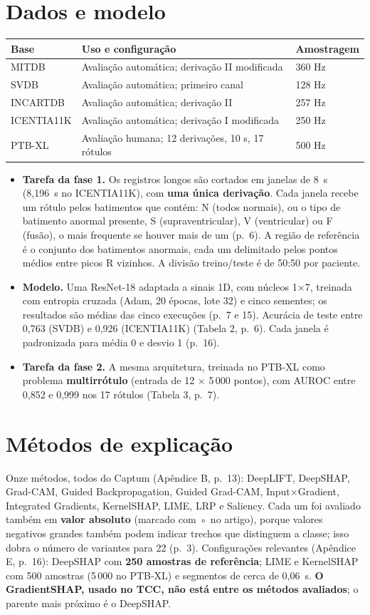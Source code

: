 \documentclass[11pt,a4paper]{article}
\begin{document}
\section{Dados e modelo}
\begin{center}\small
\begin{tabularx}{\linewidth}{lXl}
\toprule
\textbf{Base} & \textbf{Uso e configuração} & \textbf{Amostragem} \\
\midrule
MITDB & Avaliação automática; derivação II modificada & 360 Hz \\
SVDB & Avaliação automática; primeiro canal & 128 Hz \\
INCARTDB & Avaliação automática; derivação II & 257 Hz \\
ICENTIA11K & Avaliação automática; derivação I modificada & 250 Hz \\
PTB-XL & Avaliação humana; 12 derivações, 10 s, 17 rótulos & 500 Hz \\
\bottomrule
\end{tabularx}
\end{center}
\begin{itemize}
\item \textbf{Tarefa da fase 1.} Os registros longos são cortados em janelas de 8~s (8,196~s no ICENTIA11K), com \textbf{uma única derivação}. Cada janela recebe um rótulo pelos batimentos que contém: N (todos normais), ou o tipo de batimento anormal presente, S (supraventricular), V (ventricular) ou F (fusão), o mais frequente se houver mais de um (p.~6). A região de referência é o conjunto dos batimentos anormais, cada um delimitado pelos pontos médios entre picos R vizinhos. A divisão treino/teste é de 50:50 por paciente.
\item \textbf{Modelo.} Uma ResNet-18 adaptada a sinais 1D, com núcleos 1×7, treinada com entropia cruzada (Adam, 20 épocas, lote 32) e cinco sementes; os resultados são médias das cinco execuções (p.~7 e 15). Acurácia de teste entre 0,763 (SVDB) e 0,926 (ICENTIA11K) (Tabela 2, p.~6). Cada janela é padronizada para média 0 e desvio 1 (p.~16).
\item \textbf{Tarefa da fase 2.} A mesma arquitetura, treinada no PTB-XL como problema \textbf{multirrótulo} (entrada de 12 × 5\,000 pontos), com AUROC entre 0,852 e 0,999 nos 17 rótulos (Tabela 3, p.~7).
\end{itemize}

\section{Métodos de explicação}
Onze métodos, todos do Captum (Apêndice B, p.~13): DeepLIFT, DeepSHAP, Grad-CAM, Guided Backpropagation, Guided Grad-CAM, Input×Gradient, Integrated Gradients, KernelSHAP, LIME, LRP e Saliency. Cada um foi avaliado também em \textbf{valor absoluto} (marcado com ◦ no artigo), porque valores negativos grandes também podem indicar trechos que distinguem a classe; isso dobra o número de variantes para 22 (p.~3). Configurações relevantes (Apêndice E, p.~16): DeepSHAP com \textbf{250 amostras de referência}; LIME e KernelSHAP com 500 amostras (5\,000 no PTB-XL) e segmentos de cerca de 0,06~s. \textbf{O GradientSHAP, usado no TCC, não está entre os métodos avaliados}; o parente mais próximo é o DeepSHAP.
\end{document}
